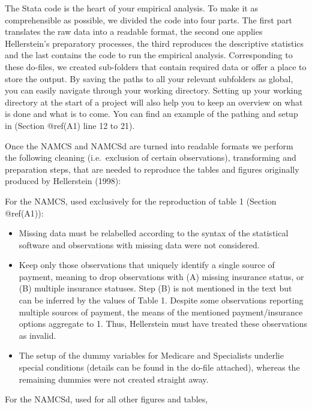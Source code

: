 \documentclass[
]{book}
\providecommand{\tightlist}{%
  \setlength{\itemsep}{0pt}\setlength{\parskip}{0pt}}
\begin{document}
The Stata code is the heart of your empirical analysis. To make it as
comprehensible as possible, we divided the code into four parts. The
first part translates the raw data into a readable format, the second
one applies Hellerstein's preparatory processes, the third reproduces
the descriptive statistics and the last contains the code to run the
empirical analysis. Corresponding to these do-files, we created
sub-folders that contain required data or offer a place to store the
output. By saving the paths to all your relevant subfolders as global,
you can easily navigate through your working directory. Setting up your
working directory at the start of a project will also help you to keep
an overview on what is done and what is to come. You can find an example
of the pathing and setup in (Section @ref(A1) line 12 to 21).

Once the NAMCS and NAMCSd are turned into readable formats we perform
the following cleaning (i.e.~exclusion of certain observations),
transforming and preparation steps, that are needed to reproduce the
tables and figures originally produced by Hellerstein (1998):

For the NAMCS, used exclusively for the reproduction of table 1 (Section
@ref(A1)):

\begin{itemize}
\tightlist
\item
  Missing data must be relabelled according to the syntax of the
  statistical software and observations with missing data were not
  considered.
\item
  Keep only those observations that uniquely identify a single source of
  payment, meaning to drop observations with (A) missing insurance
  status, or (B) multiple insurance statuses. Step (B) is not mentioned
  in the text but can be inferred by the values of Table 1. Despite some
  observations reporting multiple sources of payment, the means of the
  mentioned payment/insurance options aggregate to 1. Thus, Hellerstein
  must have treated these observations as invalid.
\item
  The setup of the dummy variables for Medicare and Specialists underlie
  special conditions (details can be found in the do-file attached),
  whereas the remaining dummies were not created straight away.
\end{itemize}

For the NAMCSd, used for all other figures and tables,
\end{document}
